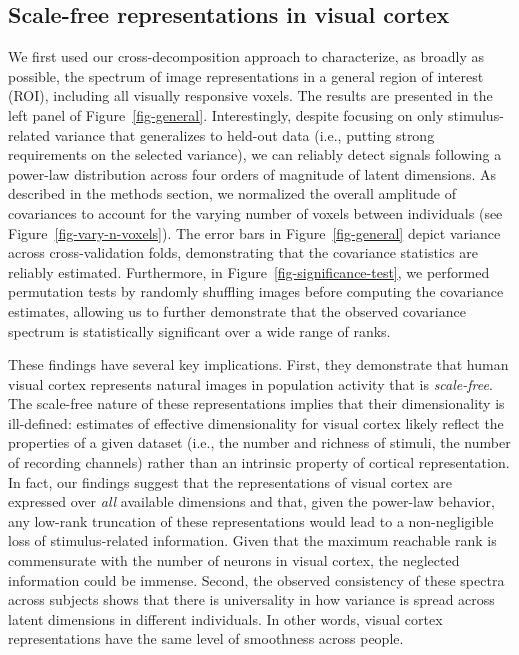 \documentclass[10pt]{article}
\begin{document}
\subsection{Scale-free representations in visual
cortex}\label{scale-free-representations-in-visual-cortex}

We first used our cross-decomposition approach to characterize, as
broadly as possible, the spectrum of image representations in a general
region of interest (ROI), including all visually responsive voxels. The
results are presented in the left panel of Figure~\ref{fig-general}.
Interestingly, despite focusing on only stimulus-related variance that
generalizes to held-out data (i.e., putting strong requirements on the
selected variance), we can reliably detect signals following a power-law
distribution across four orders of magnitude of latent dimensions. As
described in the methods section, we normalized the overall amplitude of
covariances to account for the varying number of voxels between
individuals (see Figure~\ref{fig-vary-n-voxels}). The error bars in
Figure~\ref{fig-general} depict variance across cross-validation folds,
demonstrating that the covariance statistics are reliably estimated.
Furthermore, in Figure~\ref{fig-significance-test}, we performed
permutation tests by randomly shuffling images before computing the
covariance estimates, allowing us to further demonstrate that the
observed covariance spectrum is statistically significant over a wide
range of ranks.

These findings have several key implications. First, they demonstrate
that human visual cortex represents natural images in population
activity that is \emph{scale-free}. The scale-free nature of these
representations implies that their dimensionality is ill-defined:
estimates of effective dimensionality for visual cortex likely reflect
the properties of a given dataset (i.e., the number and richness of
stimuli, the number of recording channels) rather than an intrinsic
property of cortical representation. In fact, our findings suggest that
the representations of visual cortex are expressed over \emph{all}
available dimensions and that, given the power-law behavior, any
low-rank truncation of these representations would lead to a
non-negligible loss of stimulus-related information. Given that the
maximum reachable rank is commensurate with the number of neurons in
visual cortex, the neglected information could be immense. Second, the
observed consistency of these spectra across subjects shows that there
is universality in how variance is spread across latent dimensions in
different individuals. In other words, visual cortex representations
have the same level of smoothness across people.
\end{document}
